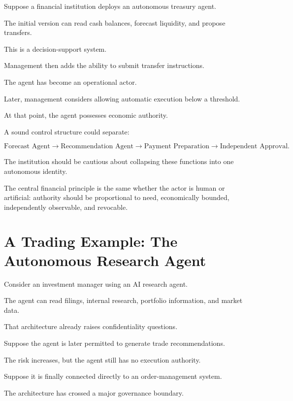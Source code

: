 Suppose a financial institution deploys an autonomous treasury agent.

The initial version can read cash balances, forecast liquidity, and propose transfers.

This is a decision-support system.

Management then adds the ability to submit transfer instructions.

The agent has become an operational actor.

Later, management considers allowing automatic execution below a threshold.

At that point, the agent possesses economic authority.

A sound control structure could separate:

\begin{equation}
\text{Forecast Agent}
\rightarrow
\text{Recommendation Agent}
\rightarrow
\text{Payment Preparation}
\rightarrow
\text{Independent Approval}.
\end{equation}

The institution should be cautious about collapsing these functions into one autonomous identity.

\begin{risklens}
The central financial principle is the same whether the actor is human or artificial: authority should be proportional to need, economically bounded, independently observable, and revocable.
\end{risklens}

\section{A Trading Example: The Autonomous Research Agent}

Consider an investment manager using an AI research agent.

The agent can read filings, internal research, portfolio information, and market data.

That architecture already raises confidentiality questions.

Suppose the agent is later permitted to generate trade recommendations.

The risk increases, but the agent still has no execution authority.

Suppose it is finally connected directly to an order-management system.

The architecture has crossed a major governance boundary.

